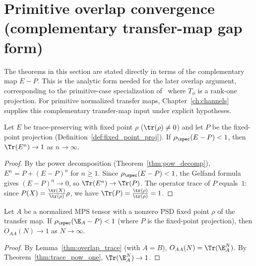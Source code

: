 \section{Primitive overlap convergence (complementary transfer-map gap form)}

The theorems in this section are stated directly in terms of the
complementary map $E - P$. This is the analytic form needed for the later
overlap argument, corresponding to the primitive-case specialization
of~\cite[Theorem~6.7]{Wolf2012Quantum} where $T_\phi$ is a rank-one
projection.
For primitive normalized transfer maps, Chapter~\ref{ch:channels} supplies
this complementary transfer-map input under explicit hypotheses.

\begin{theorem}%
    \label{thm:trace_pow_one}
    \leanok
    Let $E$ be trace-preserving with fixed point $\rho$
    ($\tr(\rho) \neq 0$) and
    let $P$ be the fixed-point projection
    (Definition~\ref{def:fixed_point_proj}).
    If $\rho_{\spec}(E - P) < 1$, then
    $\Tr(E^n) \to 1$ as $n \to \infty$.
\end{theorem}

\begin{proof}
    \leanok
    By the power decomposition
    (Theorem~\ref{thm:pow_decomp}),
    $E^n = P + (E - P)^n$ for $n \ge 1$.
    Since $\rho_{\spec}(E - P) < 1$, the Gelfand formula gives
    $(E - P)^n \to 0$, so $\Tr(E^n) \to \Tr(P)$.
    The operator trace of $P$ equals~$1$: since
    $P(X) = \frac{\tr(X)}{\tr(\rho)} \rho$,
    we have $\Tr(P) = \frac{\tr(\rho)}{\tr(\rho)} = 1$.
\end{proof}

\begin{theorem}%
    \label{thm:primitive_overlap}
    \leanok
    Let $A$ be a normalized MPS tensor with a nonzero PSD fixed
    point $\rho$ of the transfer map.
    If $\rho_{\spec}(\E_A - P) < 1$ (where $P$ is the fixed-point
    projection), then $O_{AA}(N) \to 1$ as $N \to \infty$.
\end{theorem}

\begin{proof}
    \leanok
    By Lemma~\ref{thm:overlap_trace} (with $A = B$),
    $O_{AA}(N) = \Tr(\E_A^N)$.
    By Theorem~\ref{thm:trace_pow_one},
    $\Tr(\E_A^N) \to 1$.
\end{proof}

